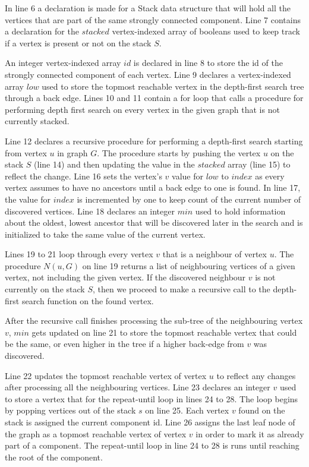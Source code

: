 \documentclass{l4proj}
\begin{document}
\noindent In line 6 a declaration is made for a Stack data structure that will hold all the vertices that are part of the same strongly connected component. Line 7 contains a declaration for the $stacked$ vertex-indexed array of booleans used to keep track if a vertex is present or not on the stack $S$.

\noindent An integer vertex-indexed array $id$ is declared in line 8 to store the id of the strongly connected component of each vertex. Line 9 declares a vertex-indexed array $low$ used to store the topmost reachable vertex in the depth-first search tree through a back edge. Lines 10 and 11 contain a for loop that calls a procedure for performing depth first search on every vertex in the given graph that is not currently stacked.

\noindent Line 12 declares a recursive procedure for performing a depth-first search starting from vertex $u$ in graph $G$. The procedure starts by pushing the vertex $u$ on the stack $S$ (line 14) and then updating the value in the $stacked$ array (line 15) to reflect the change. Line 16 sets the vertex's $v$ value for $low$ to $index$ as every vertex assumes to have no ancestors until a back edge to one is found. In line 17, the value for $index$ is incremented by one to keep count of the current number of discovered vertices. Line 18 declares an integer $min$ used to hold information about the oldest, lowest ancestor that will be discovered later in the search and is initialized to take the same value of the current vertex.

\noindent Lines 19 to 21 loop through every vertex $v$ that is a neighbour of vertex $u$. The procedure $N(u, G)$ on line 19 returns a list of neighbouring vertices of a given vertex, not including the given vertex. If the discovered neighbour $v$ is not currently on the stack $S$, then we proceed to make a recursive call to the depth-first search function on the found vertex.

\noindent After the recursive call finishes processing the sub-tree of the neighbouring vertex $v$, $min$ gets updated on line 21 to store the topmost reachable vertex that could be the same, or even higher in the tree if a higher back-edge from $v$ was discovered.

\noindent Line 22 updates the topmost reachable vertex of vertex $u$ to reflect any changes after processing all the neighbouring vertices. Line 23 declares an integer $v$ used to store a vertex that for the repeat-until loop in lines 24 to 28. The loop begins by popping vertices out of the stack $s$ on line 25. Each vertex $v$ found on the stack is assigned the current component id. Line 26 assigns the last leaf node of the graph as a topmost reachable vertex of vertex $v$ in order to mark it as already part of a component. The repeat-until loop in line 24 to 28 is runs until reaching the root of the component.
\end{document}
